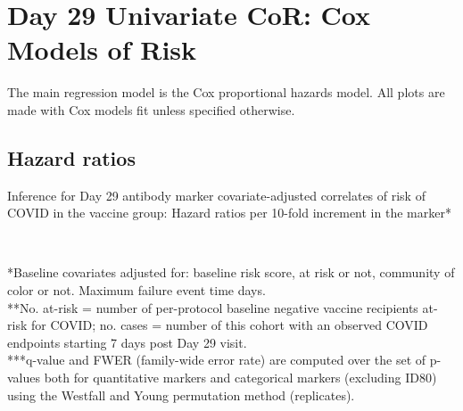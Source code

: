\documentclass[
]{article}
\begin{document}
\clearpage

\hypertarget{cor-coxph-Day29}{%
\section{Day 29 Univariate CoR: Cox Models of Risk}\label{cor-coxph-Day29}}

The main regression model is the Cox proportional hazards model. All plots are made with Cox models fit unless specified otherwise.

\hypertarget{hazard-ratios-1}{%
\subsection{Hazard ratios}\label{hazard-ratios-1}}

\begin{table}[H]
\caption{Inference for Day 29 antibody marker covariate-adjusted correlates of risk of COVID in the vaccine group: Hazard ratios per 10-fold increment in the marker*}
\begin{center}
    \\
\end{center}
*Baseline covariates adjusted for: baseline risk score, at risk or not, community of color or not. Maximum failure event time  days.\\
**No. at-risk = number of per-protocol baseline negative vaccine recipients at-risk for COVID; no. cases = number of this cohort with an observed COVID endpoints starting 7 days post Day 29 visit.\\
***q-value and FWER (family-wide error rate) are computed over the set of p-values both for quantitative markers and categorical markers (excluding ID80) using the Westfall and Young permutation method (\protect replicates). 

\end{table}
\end{document}
